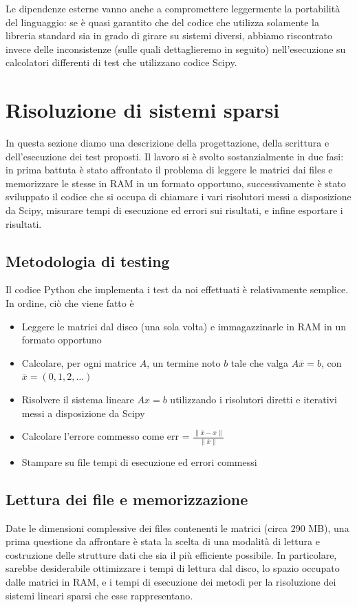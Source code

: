 \documentclass[11pt,a4paper]{scrartcl}
\begin{document}
Le dipendenze esterne vanno anche a compromettere leggermente la portabilità del linguaggio: se è quasi garantito che del codice che utilizza solamente la libreria standard sia in grado di girare su sistemi diversi, abbiamo riscontrato invece delle inconsistenze (sulle quali dettaglieremo in seguito) nell'esecuzione su calcolatori differenti di test che utilizzano codice Scipy. 


\section*{Risoluzione di sistemi sparsi}

In questa sezione diamo una descrizione della progettazione, della scrittura e dell'esecuzione dei test proposti. Il lavoro si è svolto sostanzialmente in due fasi: in prima battuta è stato affrontato il problema di leggere le matrici dai files e memorizzare le stesse in RAM in un formato opportuno, successivamente è stato sviluppato il codice che si occupa di chiamare i vari risolutori messi a disposizione da Scipy, misurare tempi di esecuzione ed errori sui risultati, e infine esportare i risultati.

\subsection*{Metodologia di testing}
Il codice Python che implementa i test da noi effettuati è relativamente semplice. In ordine, ciò che viene fatto è
\begin{itemize}
	\item Leggere le matrici dal disco (una sola volta) e immagazzinarle in RAM in un formato opportuno
	\item Calcolare, per ogni matrice $A$, un termine noto $b$ tale che valga $A\overline{x} = b$, con $\overline{x} = (0, 1, 2, \dots)$
	\item Risolvere il sistema lineare $Ax = b$ utilizzando i risolutori diretti e iterativi messi a disposizione da Scipy
	\item Calcolare l'errore commesso come err = $\tfrac{\parallel \overline{x} - x \parallel}{\parallel \overline{x} \parallel}$
	\item Stampare su file tempi di esecuzione ed errori commessi
\end{itemize}

\subsection*{Lettura dei file e memorizzazione}
Date le dimensioni complessive dei files contenenti le matrici (circa 290 MB), una prima questione da affrontare è stata la scelta di una modalità di lettura e costruzione delle strutture dati che sia il più efficiente possibile. In particolare, sarebbe desiderabile ottimizzare i tempi di lettura dal disco, lo spazio occupato dalle matrici in RAM, e i tempi di esecuzione dei metodi per la risoluzione dei sistemi lineari sparsi che esse rappresentano.
\end{document}
